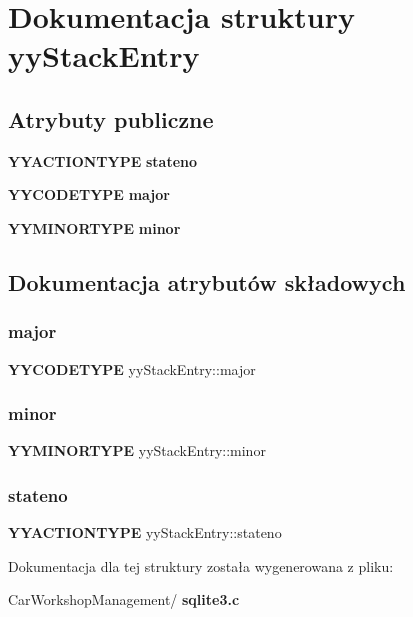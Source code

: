 \section{Dokumentacja struktury yy\+Stack\+Entry}
\label{structyy_stack_entry}
\subsection*{Atrybuty publiczne}
\begin{DoxyCompactItemize}
\item 
\textbf{ Y\+Y\+A\+C\+T\+I\+O\+N\+T\+Y\+PE} \textbf{ stateno}
\item 
\textbf{ Y\+Y\+C\+O\+D\+E\+T\+Y\+PE} \textbf{ major}
\item 
\textbf{ Y\+Y\+M\+I\+N\+O\+R\+T\+Y\+PE} \textbf{ minor}
\end{DoxyCompactItemize}


\subsection{Dokumentacja atrybutów składowych}
\mbox{\label{structyy_stack_entry_a7624d02bcf945d48068f4c383551725c}} 
\subsubsection{major}
{\footnotesize\ttfamily \textbf{ Y\+Y\+C\+O\+D\+E\+T\+Y\+PE} yy\+Stack\+Entry\+::major}

\mbox{\label{structyy_stack_entry_a024e1e64bce5945080629a2dd8d1bb4f}} 
\subsubsection{minor}
{\footnotesize\ttfamily \textbf{ Y\+Y\+M\+I\+N\+O\+R\+T\+Y\+PE} yy\+Stack\+Entry\+::minor}

\mbox{\label{structyy_stack_entry_a108164609c2e841577cc3533d8f0180d}} 
\subsubsection{stateno}
{\footnotesize\ttfamily \textbf{ Y\+Y\+A\+C\+T\+I\+O\+N\+T\+Y\+PE} yy\+Stack\+Entry\+::stateno}



Dokumentacja dla tej struktury została wygenerowana z pliku\+:\begin{DoxyCompactItemize}
\item 
Car\+Workshop\+Management/\textbf{ sqlite3.\+c}\end{DoxyCompactItemize}
